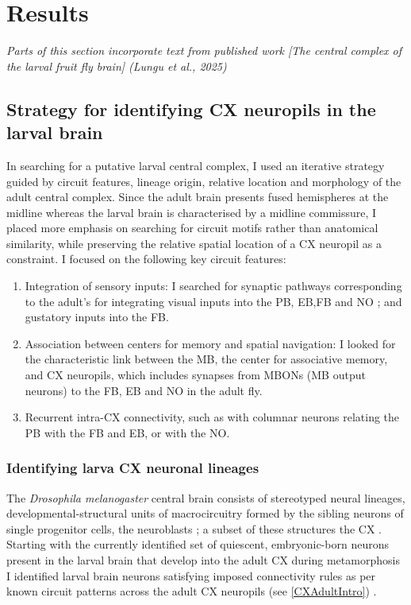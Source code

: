 
\chapter{Results}
\textit{Parts of this section incorporate text from published work [The central complex of the larval fruit fly brain] (Lungu et al., 2025)}


\section{Strategy for identifying CX neuropils in the larval brain}

    In searching for a putative larval central complex, I used an iterative strategy guided by circuit features, lineage origin, relative location and morphology of the adult central complex. Since the adult brain presents fused hemispheres at the midline whereas the larval brain is characterised by a midline commissure, I placed more emphasis on searching for circuit motifs rather than anatomical similarity,  while preserving the relative spatial location of a CX neuropil as a constraint.  I focused on the following key circuit features:
    \begin{enumerate}
    \item Integration of sensory inputs: I searched for synaptic pathways corresponding to the adult's for integrating visual inputs into the PB, EB,FB and NO \citep{hulse2021connectome}; and gustatory inputs into the FB.
    \item Association between centers for memory and spatial navigation: I looked for the characteristic link between the MB, the center for associative memory, and CX neuropils, which includes synapses from MBONs (MB output neurons) to the FB, EB and NO in the adult fly.
    \item Recurrent intra-CX connectivity, such as with columnar neurons relating the PB with the FB and EB, or with the NO.
    \end{enumerate}
    
    \subsection{Identifying larva CX neuronal lineages }
    The \textit{Drosophila melanogaster} central brain consists of stereotyped neural lineages, developmental-structural units of macrocircuitry formed by the sibling neurons of single progenitor cells, the neuroblasts \citep{Spindler2010Lineages}; a subset of these structures the CX \citep{Pereanu2011LineagesCX}. Starting with the currently identified set of quiescent, embryonic-born neurons present in the larval brain that develop into the adult CX during metamorphosis~\citep{andrade2019developmentally}
    I identified larval brain neurons satisfying imposed connectivity rules as per known circuit patterns across the adult CX neuropils \citep{wolff2015neuroarchitecture, wolff2018neuroarchitecture, franconville2018building, hulse2021connectome} (see \ref{CXAdultIntro}) .
    
